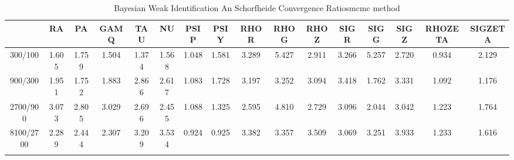 \documentclass[a4paper,10pt]{article}
\begin{document}
\centering
\begin{longtable}{cccccccccccccccc}
\toprule
 & RA & PA & GAMQ & TAU & NU & PSIP & PSIY & RHOR & RHOG & RHOZ & SIGR & SIGG & SIGZ & RHOZETA & SIGZETA \\
\midrule
300/100 & 1.605 & 1.759 & 1.504 & 1.374 & 1.568 & 1.048 & 1.581 & 3.289 & 5.427 & 2.911 & 3.266 & 5.257 & 2.720 & 0.934 & 2.129 \\
900/300 & 1.951 & 1.752 & 1.883 & 2.866 & 2.617 & 1.083 & 1.728 & 3.197 & 3.252 & 3.094 & 3.418 & 1.762 & 3.331 & 1.092 & 1.176 \\
2700/900 & 3.073 & 2.805 & 3.029 & 2.696 & 2.455 & 1.088 & 1.325 & 2.595 & 4.810 & 2.729 & 3.096 & 2.044 & 3.042 & 1.223 & 1.764 \\
8100/2700 & 2.289 & 2.444 & 2.307 & 3.209 & 3.534 & 0.924 & 0.925 & 3.382 & 3.357 & 3.509 & 3.069 & 3.251 & 3.933 & 1.233 & 1.616 \\
\bottomrule
\caption{Bayesian Weak Identification An Schorfheide Convergence Ratiosmcmc method}
\label{table:tbl:WeakAnSchoConvergenceRatios_mcmc}
\end{longtable}
\end{document}
